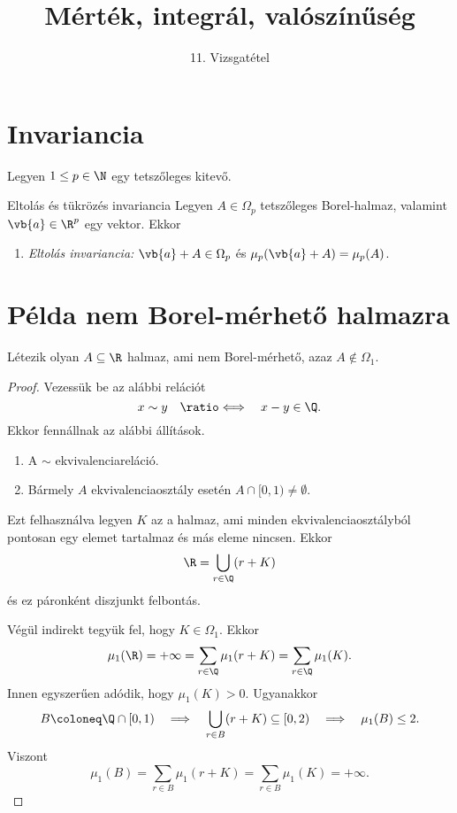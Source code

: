 \documentclass[
]{elteikthesis}[2024/04/26]
\title{Mérték, integrál, valószínűség} %
\subtitle{11. Vizsgatétel}
\begin{document}
	
	
	\section{Invariancia}
	
	Legyen \( 1 \leq p \in \N \) egy tetszőleges kitevő.
	
	\begin{statement}{Eltolás és tükrözés invariancia}{}
		Legyen \( A \in \Omega_p \) tetszőleges Borel-halmaz, 
		valamint \( \vb{a} \in \R^p \) egy vektor. Ekkor
		\begin{enumerate}
			\item
			\emph{Eltolás invariancia:}
			\( \vb{a} + A \in \Omega_p \) 
			\quad és \quad 
			\( \mu_p( \vb{a} + A ) = \mu_p(A) \).
		\end{enumerate}
	\end{statement}
	
	\newpage
	\section{Példa nem Borel-mérhető halmazra}
	
	\begin{statement}{}{}
		Létezik olyan \( A \subseteq \R \) halmaz, ami nem Borel-mérhető, 
		azaz \( A \notin \Omega_1. \)
	\end{statement}
	\begin{proof}
		Vezessük be az alábbi relációt
		\[
			x \sim y
			\quad \ratio\Longleftrightarrow \quad
			x - y \in \Q.
		\]
		Ekkor fennállnak az alábbi állítások.
		\begin{enumerate}
			\item A \( \sim \) ekvivalenciareláció.
			\item Bármely \( A \) ekvivalenciaosztály esetén \( A \cap [0, 1) \neq \emptyset \).
		\end{enumerate}
		Ezt felhasználva legyen \( K \) az a halmaz, 
		ami minden ekvivalenciaosztályból pontosan egy elemet tartalmaz és más eleme nincsen.
		Ekkor
		\[
			\R = \bigcup_{r \in \Q} (r + K)
		\]
		és ez páronként diszjunkt felbontás.
		
		Végül indirekt tegyük fel, hogy \( K \in \Omega_1 \). Ekkor
		\[
			\mu_1( \R ) = 
			+\infty =
			\sum_{r \in \Q} \mu_1(r + K) = 
			\sum_{r \in \Q} \mu_1(K).
		\]
		Innen egyszerűen adódik, hogy \( \mu_1(K) > 0 \). Ugyanakkor
		\[
			B \coloneq \Q \cap [0, 1)
			\quad \Longrightarrow \quad
			\bigcup_{r \in B} (r + K) \subseteq [0, 2)
			\quad \Longrightarrow \quad
			\mu_1(B) \leq 2.
		\]
		Viszont
		\[
			\mu_1(B) =
			\sum_{r \in B} \mu_1(r + K) =
			\sum_{r \in B} \mu_1(K) =
			+\infty.
		\]
	\end{proof}
	
\end{document}
